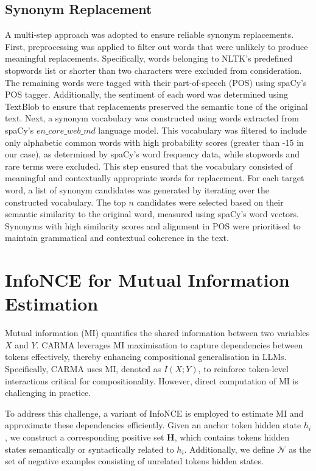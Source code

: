 \subsection{Synonym Replacement}\label{sec:syn_replacement}
A multi-step approach was adopted to ensure reliable synonym replacements. First, preprocessing was applied to filter out words that were unlikely to produce meaningful replacements. Specifically, words belonging to NLTK's predefined stopwords list or shorter than two characters were excluded from consideration. The remaining words were tagged with their part-of-speech (POS) using spaCy's \cite{honnibal2020spacy} POS tagger. Additionally, the sentiment of each word was determined using TextBlob \cite{loria2018textblob} to ensure that replacements preserved the semantic tone of the original text.
Next, a synonym vocabulary was constructed using words extracted from spaCy's $en\_core\_web\_md$ language model. This vocabulary was filtered to include only alphabetic common words with high probability scores (greater than -15 in our case), as determined by spaCy's word frequency data, while stopwords and rare terms were excluded. This step ensured that the vocabulary consisted of meaningful and contextually appropriate words for replacement.
For each target word, a list of synonym candidates was generated by iterating over the constructed vocabulary. The top $n$ candidates were selected based on their semantic similarity to the original word, measured using spaCy's word vectors. Synonyms with high similarity scores and alignment in POS were prioritised to maintain grammatical and contextual coherence in the text.

\section{InfoNCE for Mutual Information Estimation}\label{sec:infoNCE_MI}
Mutual information (MI) quantifies the shared information between two variables \(X\) and \(Y\). CARMA leverages MI maximisation to capture dependencies between tokens effectively, thereby enhancing compositional generalisation in LLMs. Specifically, CARMA uses MI, denoted as \(I(X; Y)\), to reinforce token-level interactions critical for compositionality. However, direct computation of MI is challenging in practice.

To address this challenge, a variant of InfoNCE is employed to estimate MI and approximate these dependencies efficiently. Given an anchor token hidden state \(h_i\), we construct a corresponding positive set \(\mathbf{H}\), which contains tokens hidden states semantically or syntactically related to \(h_i\). Additionally, we define \(\mathcal{N}\) as the set of negative examples consisting of unrelated tokens hidden states.

